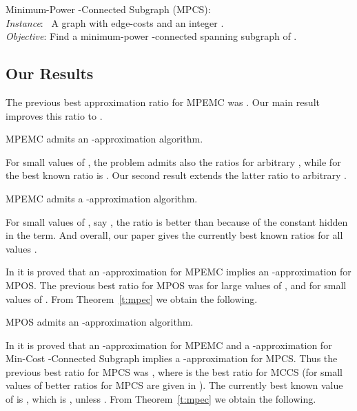 \documentclass{llncs}
\begin{document}
\vspace{0.2cm}

\noindent
{\sf Minimum-Power -Connected Subgraph} ({\sf MPCS}): \\
{\em Instance}: \ 
A graph  with edge-costs  and an integer . \\
{\em Objective}: 
Find a minimum-power -connected spanning subgraph  of .


\subsection{Our Results}
The previous best approximation ratio for {\sf MPEMC} was  \cite{KMNT}. 
Our main result improves this ratio to .

\begin{theorem} \label{t:mpec}
{\sf MPEMC} admits an -approximation algorithm.
\end{theorem}

For small values of , the problem admits also the ratios 
for arbitrary  \cite{HKMN}, while for  the best known ratio is  \cite{KN-cov}. 
Our second result extends the latter ratio to arbitrary .

\begin{theorem} \label{t:mpec'}
{\sf MPEMC} admits a -approximation algorithm.
\end{theorem}

For small values of , say , the ratio  is better than
 because of the constant hidden in the  term.
And overall, our paper gives the currently best known ratios for all values .

\vspace*{0.1cm}

In \cite{LYN} it is proved that an -approximation for {\sf MPEMC} implies an 
-approximation for {\sf MPOS}.
The previous best ratio for {\sf MPOS}  was 
 \cite{LYN} for large values of , 
and  for small values of  \cite{zeev-p}.
From Theorem~\ref{t:mpec} we obtain the following.

\begin{theorem} \label{c:mpoc}
{\sf MPOS} admits an -approximation algorithm.
\end{theorem}

In \cite{HKMN} it is proved that an -approximation for {\sf MPEMC}
and a -approximation for {\sf Min-Cost -Connected Subgraph} implies a 
-approximation for {\sf MPCS}.
Thus the previous best ratio for {\sf MPCS} was
 \cite{KMNT}, where  is the best ratio for {\sf MCCS}
(for small values of  better ratios for {\sf MPCS} are given in \cite{zeev-p}).
The currently best known value of  is  \cite{zeevnew},
which is , unless .
From Theorem~\ref{t:mpec} we obtain the following.
\end{document}
